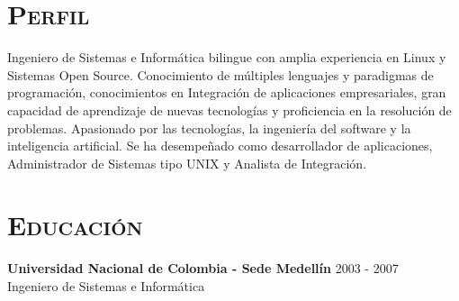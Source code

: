 \begin{resume}


\section{\textsc{Perfil}}
Ingeniero de Sistemas e Inform\'{a}tica bilingue con amplia
experiencia en Linux y Sistemas Open Source.  Conocimiento de m\'{u}ltiples
lenguajes y paradigmas de programaci\'{o}n, conocimientos en  Integraci\'{o}n
de aplicaciones empresariales, gran capacidad de
aprendizaje de nuevas tecnolog\'{i}as y proficiencia en la resoluci\'{o}n de
problemas.  Apasionado por las tecnolog\'{i}as, la ingenier\'{i}a del software y la inteligencia artificial. Se ha desempeñado
como desarrollador de aplicaciones, 
 Administrador de Sistemas tipo UNIX y Analista de
Integraci\'{o}n. 
 

\section{\textsc{Educaci\'{o}n}}
\textbf{Universidad Nacional de Colombia  - Sede  Medell\'{i}n} \hfill 2003 - 2007 \\
{Ingeniero de Sistemas e Inform\'{a}tica } \hfill


\end{resume}
